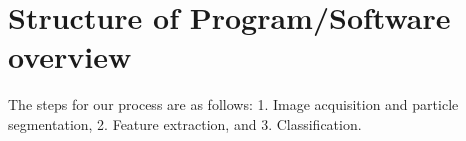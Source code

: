 \section{Structure of Program/Software overview} 

The steps for our process are as follows: 1. Image acquisition and particle segmentation, 2. Feature extraction, and 3. Classification.

    
    
    
    
    
    
    
    
    
    
    
    
    
  
  
  
  
  
  
  